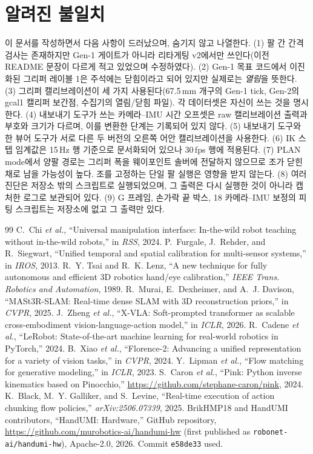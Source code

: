 \documentclass[conference,10pt]{IEEEtran}
\newcommand{\mm}{\,mm\xspace}
\begin{document}
\section{알려진 불일치}\label{sec:issues}
이 문서를 작성하면서 다음 사항이 드러났으며, 숨기지 않고 나열한다. (1) 팔 간 간격 검사는 존재하지만 Gen-1 게이트가 아니라 리타게팅
v2에서만 쓰인다(이전 README 문장이 다르게 적고 있었으며 수정하였다). (2) Gen-1 목표 코드에서 이진화된 그리퍼 레이블 1은 주석에는
닫힘이라고 되어 있지만 실제로는 \emph{열림}을 뜻한다. (3) 그리퍼 캘리브레이션이 세 가지 사용된다(67.5\mm{} 개구의 Gen-1 tick, Gen-2의
gcal1 캘리퍼 보간점, 수집기의 열림/닫힘 파일). 각 데이터셋은 자신이 쓰는 것을 명시한다. (4) 내보내기 도구가 쓰는 카메라--IMU 시간
오프셋은 raw 캘리브레이션 출력과 부호와 크기가 다르며, 이를 변환한 단계는 기록되어 있지 않다. (5) 내보내기 도구와 한 뷰어 도구가 서로
다른 두 버전의 오른쪽 어안 캘리브레이션을 사용한다. (6) IK 스텝 임계값은 15\,Hz 행 기준으로 문서화되어 있으나 30\,fps 행에 적용된다.
(7) PLAN mode에서 양팔 경로는 그리퍼 폭을 웨이포인트 솔버에 전달하지 않으므로 조가 닫힌 채로 남을 가능성이 높다. 조를 고정하는
단일 팔 실행은 영향을 받지 않는다. (8) 여러 진단은 저장소 밖의 스크립트로 실행되었으며, 그 출력은 다시 실행한 것이 아니라 캡처한
로그로 보관되어 있다. (9) G 프레임, 손가락 끝 박스, 18\textdegree{} 카메라--IMU 보정의 피팅 스크립트는 저장소에 없고 그 출력만 있다.

\begin{thebibliography}{99}\footnotesize
{} C.~Chi \emph{et al.}, ``Universal manipulation interface: In-the-wild robot teaching without in-the-wild robots,'' in \emph{RSS}, 2024.
 P.~Furgale, J.~Rehder, and R.~Siegwart, ``Unified temporal and spatial calibration for multi-sensor systems,'' in \emph{IROS}, 2013.
 R.~Y. Tsai and R.~K. Lenz, ``A new technique for fully autonomous and efficient 3D robotics hand/eye calibration,'' \emph{IEEE Trans. Robotics and Automation}, 1989.
 R.~Murai, E.~Dexheimer, and A.~J. Davison, ``MASt3R-SLAM: Real-time dense SLAM with 3D reconstruction priors,'' in \emph{CVPR}, 2025.
 J.~Zheng \emph{et al.}, ``X-VLA: Soft-prompted transformer as scalable cross-embodiment vision-language-action model,'' in \emph{ICLR}, 2026.
 R.~Cadene \emph{et al.}, ``LeRobot: State-of-the-art machine learning for real-world robotics in PyTorch,'' 2024.
 B.~Xiao \emph{et al.}, ``Florence-2: Advancing a unified representation for a variety of vision tasks,'' in \emph{CVPR}, 2024.
 Y.~Lipman \emph{et al.}, ``Flow matching for generative modeling,'' in \emph{ICLR}, 2023.
 S.~Caron \emph{et al.}, ``Pink: Python inverse kinematics based on Pinocchio,'' \url{https://github.com/stephane-caron/pink}, 2024.
 K.~Black, M.~Y. Galliker, and S.~Levine, ``Real-time execution of action chunking flow policies,'' \emph{arXiv:2506.07339}, 2025.
 BrikHMP18 and HandUMI contributors, ``HandUMI: Hardware,'' GitHub repository, \url{https://github.com/murobotics-ai/handumi-hw} (first published as \texttt{robonet-ai/handumi-hw}), Apache-2.0, 2026. Commit \texttt{e58de33} used.
\end{thebibliography}
\end{document}
